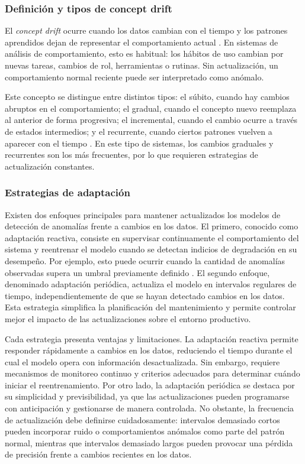 \subsubsection{Definición y tipos de concept drift}
El \emph{concept drift} ocurre cuando los datos cambian con el tiempo y los patrones aprendidos dejan de representar el comportamiento actual \parencite{Gama2014}. En sistemas de análisis de comportamiento, esto es habitual: los hábitos de uso cambian por nuevas tareas, cambios de rol, herramientas o rutinas. Sin actualización, un comportamiento normal reciente puede ser interpretado como anómalo.

Este concepto se distingue entre distintos tipos: el súbito, cuando hay cambios abruptos en el comportamiento; el gradual, cuando el concepto nuevo reemplaza al anterior de forma progresiva; el incremental, cuando el cambio ocurre a través de estados intermedios; y el recurrente, cuando ciertos patrones vuelven a aparecer con el tiempo \parencite{Gama2014}. En este tipo de sistemas, los cambios graduales y recurrentes son los más frecuentes, por lo que requieren estrategias de actualización constantes.

\subsubsection{Estrategias de adaptación}\label{sec:estrategias-drift}
Existen dos enfoques principales para mantener actualizados los modelos de detección de anomalías frente a cambios en los datos. El primero, conocido como adaptación reactiva, consiste en supervisar continuamente el comportamiento del sistema y reentrenar el modelo cuando se detectan indicios de degradación en su desempeño. Por ejemplo, esto puede ocurrir cuando la cantidad de anomalías observadas supera un umbral previamente definido \parencite{Bagui2025}. El segundo enfoque, denominado adaptación periódica, actualiza el modelo en intervalos regulares de tiempo, independientemente de que se hayan detectado cambios en los datos. Esta estrategia simplifica la planificación del mantenimiento y permite controlar mejor el impacto de las actualizaciones sobre el entorno productivo.

Cada estrategia presenta ventajas y limitaciones. La adaptación reactiva permite responder rápidamente a cambios en los datos, reduciendo el tiempo durante el cual el modelo opera con información desactualizada. Sin embargo, requiere mecanismos de monitoreo continuo y criterios adecuados para determinar cuándo iniciar el reentrenamiento. Por otro lado, la adaptación periódica se destaca por su simplicidad y previsibilidad, ya que las actualizaciones pueden programarse con anticipación y gestionarse de manera controlada. No obstante, la frecuencia de actualización debe definirse cuidadosamente: intervalos demasiado cortos pueden incorporar ruido o comportamientos anómalos como parte del patrón normal, mientras que intervalos demasiado largos pueden provocar una pérdida de precisión frente a cambios recientes en los datos.

